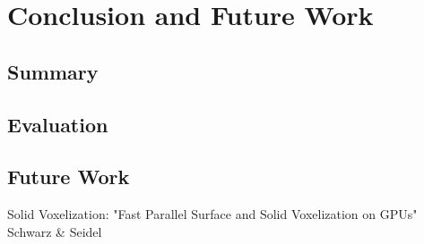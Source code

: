 \documentclass[thesis.tex]{subfiles}
\begin{document}
\chapter{Conclusion and Future Work}

\section{Summary}


\section{Evaluation}


\section{Future Work}

Solid Voxelization: "Fast Parallel Surface and Solid Voxelization on GPUs"  Schwarz \& Seidel 

\subfilebib %
\end{document}
